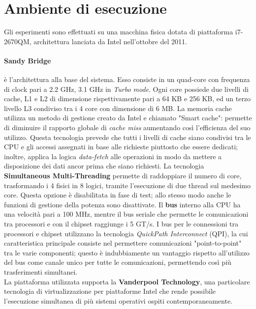 \section{Ambiente di esecuzione}
\label{sec:ambiente}

Gli esperimenti sono effettuati su una macchina fisica dotata di piattaforma i7-2670QM, architettura lanciata da Intel nell'ottobre del 2011.\\

\paragraph{Sandy Bridge} è l'architettura alla base del sistema. Esso consiste in un quad-core con frequenza di clock pari a 2.2 GHz, 3.1 GHz in \textit{Turbo mode}. Ogni core possiede due livelli di cache, L1 e L2 di dimensione rispettivamente pari a 64 KB e 256 KB, ed un terzo livello L3 condiviso tra i 4 core con dimensione di 6 MB. La memoria cache utilizza un metodo di gestione creato da Intel e chiamato "Smart cache": permette di diminuire il rapporto globale di \textit{cache miss} aumentando così l'efficienza del suo utilizzo. Questa tecnologia prevede che tutti i livelli di cache siano condivisi tra le CPU e gli accessi assegnati in base alle richieste piuttosto che essere dedicati; inoltre, applica la logica \textit{data-fetch} alle operazioni in modo da mettere a disposizione dei dati ancor prima che siano richiesti. La tecnologia \textbf{Simultaneous Multi-Threading} permette di raddoppiare il numero di core, trasformando i 4 fisici in 8 logici, tramite l'esecuzione di due thread sul medesimo core. Questa opzione è disabilitata in fase di test; allo stesso modo anche le funzioni di gestione della potenza sono disattivate. Il \textbf{bus} interno alla CPU ha una velocità pari a 100 MHz, mentre il bus seriale che permette le comunicazioni tra processori e con il chipset raggiunge i 5 GT/s. I bus per le connessioni tra processori e chipset utilizzano la tecnologia \textit{QuickPath Interconnect} (QPI), la cui caratteristica principale consiste nel permettere comunicazioni "point-to-point" tra le varie componenti; questo è indubbiamente un vantaggio rispetto all'utilizzo del bus come canale unico per tutte le comunicazioni, permettendo così più trasferimenti simultanei.\\
La piattaforma utilizzata supporta la \textbf{Vanderpool Technology}, una particolare tecnologia di virtualizzazione per piattaforme Intel che rende possibile l'esecuzione simultanea di più sistemi operativi ospiti contemporaneamente.\\

